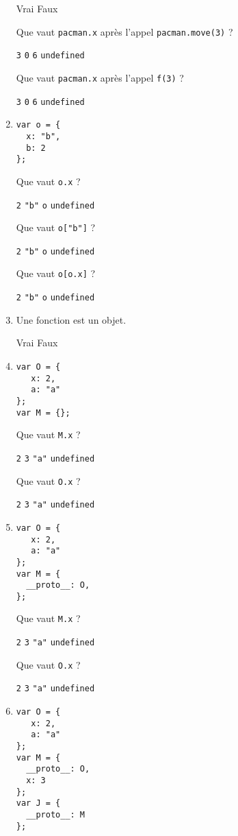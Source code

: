 \documentclass[a4paper, 12pt]{article}
\newcommand{\fullpoint}[1]{\textcolor{RubineRed}{#1}}
\newcommand{\choice}[1]{\Square\hspace{2pt} #1\hspace{5pt}}
\newcommand{\choicec}[1]{\Square\hspace{2pt} \lstinline{#1}\hspace{5pt}}
\newcommand{\choiceg}[1]{\fullpoint{\XBox\hspace{2pt} #1\hspace{5pt}}}
\newcommand{\choicecg}[1]{\fullpoint{\XBox\hspace{2pt} \lstinline{#1}\hspace{5pt}}}
\begin{document}
\begin{enumerate}
  \choice{Vrai} \choiceg{Faux}

  Que vaut \lstinline{pacman.x} après l'appel
  \lstinline{pacman.move(3)} ?

  \choicecg{3} \choicec{0} \choicec{6} \choicec{undefined}

  Que vaut \lstinline{pacman.x} après l'appel \lstinline{f(3)} ?

  \choicecg{3} \choicec{0} \choicec{6} \choicec{undefined}
\item \lstset{language=javascript}
\begin{lstlisting}
var o = {
  x: "b",
  b: 2
};
\end{lstlisting}

  Que vaut \lstinline{o.x} ?

  \choicec{2} \choicecg{"b"} \choicec{o} \choicec{undefined}

  Que vaut \lstinline{o["b"]} ?

  \choicecg{2} \choicec{"b"} \choicec{o} \choicec{undefined}

  Que vaut \lstinline{o[o.x]} ?

  \choicecg{2} \choicec{"b"} \choicec{o} \choicec{undefined}
\item Une fonction est un objet.

   \choiceg{Vrai} \choice{Faux}
\item \lstset{language=javascript}
\begin{lstlisting}
var O = {
   x: 2,
   a: "a"
};
var M = {};
\end{lstlisting}

  Que vaut \lstinline{M.x} ?

  \choicec{2} \choicec{3} \choicec{"a"} \choicecg{undefined}

  Que vaut \lstinline{O.x} ?

  \choicecg{2} \choicec{3} \choicec{"a"} \choicec{undefined}
\item \lstset{language=javascript}
\begin{lstlisting}
var O = {
   x: 2,
   a: "a"
};
var M = {
  __proto__: O,
};
\end{lstlisting}

  Que vaut \lstinline{M.x} ?

  \choicecg{2} \choicec{3} \choicec{"a"} \choicec{undefined}

  Que vaut \lstinline{O.x} ?

  \choicecg{2} \choicec{3} \choicec{"a"} \choicec{undefined}
\item \lstset{language=javascript}
\begin{lstlisting}
var O = {
   x: 2,
   a: "a"
};
var M = {
  __proto__: O,
  x: 3
};
var J = {
  __proto__: M
};
\end{lstlisting}


\end{enumerate}
\end{document}

